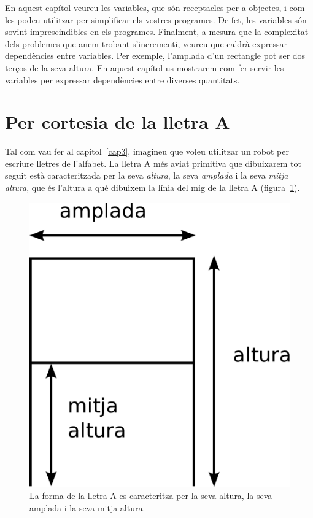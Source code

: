 En aquest capítol veureu les variables, que són receptacles per a objectes, i com les podeu utilitzar per simplificar els vostres programes. De fet, les variables són sovint imprescindibles en els programes. Finalment, a mesura que la complexitat dels problemes que anem trobant s'incrementi, veureu que caldrà expressar dependències entre variables. Per exemple, l'amplada d'un rectangle pot ser dos terços de la seva altura. En aquest capítol us mostrarem com fer servir les variables per expressar dependències entre diverses quantitats.

\section{Per cortesia de la lletra A}
Tal com vau fer al capítol~\ref{cap3}, imagineu que voleu utilitzar un robot per escriure lletres de l'alfabet. La lletra A més aviat primitiva que dibuixarem tot seguit està caracteritzada per la seva \emph{altura}, la seva \emph{amplada} i la seva \emph{mitja altura}, que és l'altura a què dibuixem la línia del mig de la lletra A (figura~\ref{fig0801}).   
\begin{figure}[h]
\begin{center}
\includegraphics[scale=0.25]{Imatges/figura8-1.pdf}
\end{center}
\caption{La forma de la lletra A es caracteritza per la seva altura, la seva amplada i la seva mitja altura.}
\label{fig0801}
\end{figure}

